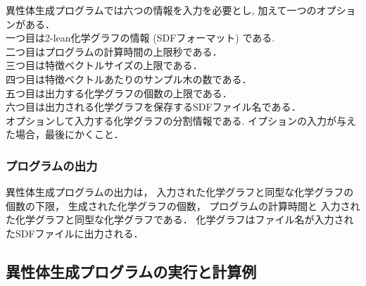 \documentclass[11pt,titlepage,dvipdfmx,twoside]{jarticle}
\begin{document}
異性体生成プログラムでは六つの情報を入力を必要とし, 加えて一つのオプションがある．\\
一つ目は2-lean化学グラフの情報 (SDFフォーマット) である.\\
二つ目はプログラムの計算時間の上限秒である．\\
三つ目は特徴ベクトルサイズの上限である．\\
四つ目は特徴ベクトルあたりのサンプル木の数である．\\
五つ目は出力する化学グラフの個数の上限である．\\
六つ目は出力される化学グラフを保存するSDFファイル名である．\\
オプションして入力する化学グラフの分割情報である.
イプションの入力が与えた場合，最後にかくこと．

\bigskip





\subsubsection{プログラムの出力}
\label{sec:Output_m}

異性体生成プログラムの出力は，
入力された化学グラフと同型な化学グラフの個数の下限，
生成された化学グラフの個数，
プログラムの計算時間と
入力された化学グラフと同型な化学グラフである．
化学グラフはファイル名が入力されたSDFファイルに出力される．

\bigskip




\subsection{異性体生成プログラムの実行と計算例}
\label{sec:Example_m}
\end{document}
